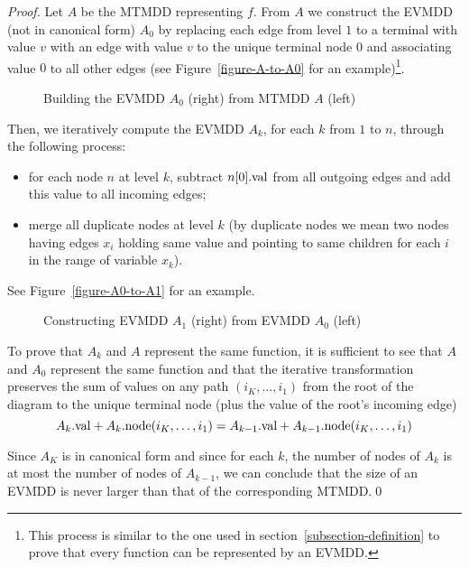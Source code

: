 \documentclass[a4paper,oneside,11pt,pdftex]{llncs}
\newcommand{\val}[1]{#1{\rm .val}}
\newcommand{\node}[1]{#1{\rm .node}}
\begin{document}
\begin{proof}
  Let $A$ be the MTMDD representing $f$. From $A$ we construct the EVMDD (not in canonical form) $A_0$ by replacing each edge from level $1$ to a terminal with value $v$ with an edge with value $v$ to the unique terminal node $0$ and associating value $0$ to all other edges (see Figure~\vref{figure-A-to-A0} for an example)\footnote{This process is similar to the one used in section~\vref{subsection-definition} to prove that every function can be represented by an EVMDD.}.
  \begin{figure}[htbp]
    \centering
    
    \caption{Building the EVMDD $A_0$ (right) from MTMDD $A$ (left)}
    \label{figure-A-to-A0}
  \end{figure}
  Then, we iteratively compute the EVMDD $A_k$, for each $k$ from $1$ to $n$, through the following process:
  \begin{itemize}
  \item for each node $n$ at level $k$, subtract $\val{n[0]}$ from all outgoing edges and add this value to all incoming edges;
  \item merge all duplicate nodes at level $k$ (by duplicate nodes we mean two nodes having edges $x_i$ holding same value and pointing to same children for each $i$ in the range of variable $x_k$).
  \end{itemize}
  See Figure~\vref{figure-A0-to-A1} for an example.

  \begin{figure}[htbp]
    \centering
        
    \caption{Constructing EVMDD $A_1$ (right) from EVMDD $A_0$ (left)}
    \label{figure-A0-to-A1}
  \end{figure}

To prove that $A_k$ and $A$ represent the same function, it is 
sufficient to see that $A$ and $A_0$ represent the same function and that 
the iterative transformation preserves the sum of values on any path $(i_K, \ldots, i_1)$ from 
the root of the diagram to the unique terminal node (plus the value
of the root's incoming edge)
$$
\val{A_k}+\node{A_k}(i_K, \ldots, i_1) = \val{A_{k-1}}+\node{A_{k-1}}(i_K, \ldots, i_1)
$$

Since $A_K$ is in canonical form and since for each $k$, the number of nodes of 
$A_k$ is at most the number of nodes of $A_{k-1}$, 
we can conclude that the size of an EVMDD is never larger than that of the corresponding MTMDD.\qed 
\end{proof}
\end{document}
